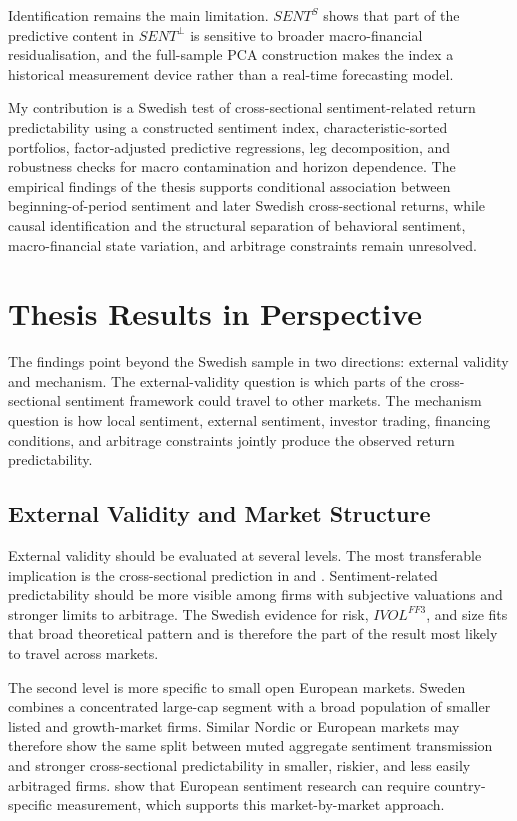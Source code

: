 \documentclass[11pt]{article}
\newcommand{\var}[1]{\ensuremath{#1}}
\begin{document}
Identification remains the main limitation. \var{SENT^{S}} shows that part of the predictive content in \var{SENT^{\perp}} is sensitive to broader macro-financial residualisation, and the full-sample PCA construction makes the index a historical measurement device rather than a real-time forecasting model. 

My contribution is a Swedish test of cross-sectional sentiment-related return predictability using a constructed sentiment index, characteristic-sorted portfolios, factor-adjusted predictive regressions, leg decomposition, and robustness checks for macro contamination and horizon dependence. The empirical findings of the thesis supports conditional association between beginning-of-period sentiment and later Swedish cross-sectional returns, while causal identification and the structural separation of behavioral sentiment, macro-financial state variation, and arbitrage constraints remain unresolved.

\section{Thesis Results in Perspective}
The findings point beyond the Swedish sample in two directions: external validity and mechanism. The external-validity question is which parts of the cross-sectional sentiment framework could travel to other markets. The mechanism question is how local sentiment, external sentiment, investor trading, financing conditions, and arbitrage constraints jointly produce the observed return predictability.

\subsection{External Validity and Market Structure}
External validity should be evaluated at several levels. The most transferable implication is the cross-sectional prediction in \citet{baker2006sentiment} and \citet{baker2007}. Sentiment-related predictability should be more visible among firms with subjective valuations and stronger limits to arbitrage. The Swedish evidence for risk, \var{IVOL^{FF3}}, and size fits that broad theoretical pattern and is therefore the part of the result most likely to travel across markets.

The second level is more specific to small open European markets. Sweden combines a concentrated large-cap segment with a broad population of smaller listed and growth-market firms. Similar Nordic or European markets may therefore show the same split between muted aggregate sentiment transmission and stronger cross-sectional predictability in smaller, riskier, and less easily arbitraged firms. \citet{finter2012german} show that European sentiment research can require country-specific measurement, which supports this market-by-market approach.
\end{document}
